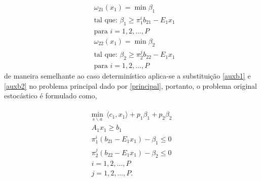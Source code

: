\begin{align}
	\label{auxb1}
&\omega_{21}(x_1) = \min  \beta_{1}\nonumber \\
	&\mbox{tal que: }\beta_{1}  \geq {\pi}_{1}^{i}b_{21} - E_1 x_1 \\
	&\mbox{para }i = 1,2,\dots, P  \nonumber
  \end{align}
\begin{align}
	\label{auxb2}
&\omega_{22}(x_1) = \min  \beta_{2}\nonumber \\
	&\mbox{tal que: }\beta_{2}  \geq {\pi}_{2}^{j}b_{22} - E_1 x_1 \\
	&\mbox{para }i = 1,2,\dots, P  \nonumber
  \end{align}
 de maneira semelhante ao caso determin\'istico aplica-se a substitui\c c\~ao \ref{auxb1} e \ref{auxb2} no problema
 principal  dado por \ref{principal}, portanto, o problema original estoc\'astico \'e formulado como,

 \begin{align}
 \begin{aligned}
	\underset {s \backslash a} {\text{min}} \ \ \langle c_1,x_1\rangle + p_1 {\beta}_{1} + p_2 {\beta}_{2} \\
	A_1 x_1 \geq b_1 \\
	{\pi}_{1}^{i}(b_{21} - E_1x_1) - {\beta}_{1} \leq 0 \\ 
	{\pi}_{2}^{j}(b_{22} - E_1x_1) - {\beta}_{2} \leq 0 \\ 
	i = 1, 2, \dots , P \\
	j = 1, 2, \dots , P. \\
  \end{aligned}
  \label{pd5}
\end{align}

